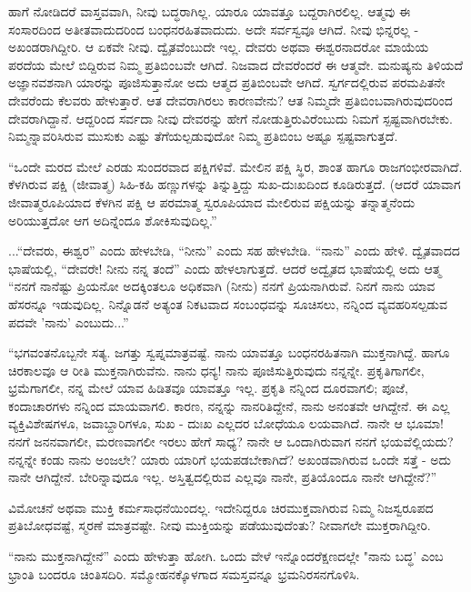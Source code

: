 ಹಾಗೆ ನೋಡಿದರೆ ವಾಸ್ತವವಾಗಿ, ನೀವು ಬದ್ಧರಾಗಿಲ್ಲ. ಯಾರೂ ಯಾವತ್ತೂ ಬದ್ದರಾಗಿರಲಿಲ್ಲ. ಆತ್ಮವು ಈ ಸಂಸಾರದಿಂದ ಅತೀತವಾದುದರಿಂದ ಬಂಧನರಹಿತವಾದುದು. ಅದೇ ಸರ್ವಸ್ವವೂ ಆಗಿದೆ. ನೀವು ಭಿನ್ನರಲ್ಲ - ಅಖಂಡರಾಗಿದ್ದೀರಿ. ಆ ಏಕವೇ ನೀವು. ದ್ವೈತವೆಂಬುದೇ ಇಲ್ಲ. ದೇವರು ಅಥವಾ ಈಶ್ವರನಾದರೋ ಮಾಯೆಯ ಪರದೆಯ ಮೇಲೆ ಬಿದ್ದಿರುವ ನಿಮ್ಮ ಪ್ರತಿಬಿಂಬವೇ ಆಗಿದೆ. ನಿಜವಾದ ದೇವರೆಂದರೆ ಈ ಆತ್ಮವೇ. ಮನುಷ್ಯನು ತಿಳಿಯದೆ ಅಜ್ಞಾನವಶನಾಗಿ ಯಾರನ್ನು ಪೂಜಿಸುತ್ತಾನೋ ಅದು ಆತ್ಮದ ಪ್ರತಿಬಿಂಬವೇ ಆಗಿದೆ. ಸ್ವರ್ಗದಲ್ಲಿರುವ ಪರಮಪಿತನೇ ದೇವರೆಂದು ಕೆಲವರು ಹೇಳುತ್ತಾರೆ. ಆತ ದೇವರಾಗಿರಲು ಕಾರಣವೇನು? ಆತ ನಿಮ್ಮದೇ ಪ್ರತಿಬಿಂಬವಾಗಿರುವುದರಿಂದ ದೇವರಾಗಿದ್ದಾನೆ. ಆದ್ದರಿಂದ ಸರ್ವದಾ ನೀವು ದೇವರನ್ನು ಹೇಗೆ ನೋಡುತ್ತಿರುವಿರೆಂಬುದು ನಿಮಗೆ ಸ್ಪಷ್ಟವಾಗಿರಬೇಕು. ನಿಮ್ಮನ್ನಾವರಿಸಿರುವ ಮುಸುಕು ಎಷ್ಟು ತೆಗೆಯಲ್ಪಡುವುದೋ ನಿಮ್ಮ ಪ್ರತಿಬಿಂಬ ಅಷ್ಟೂ ಸ್ಪಷ್ಟವಾಗುತ್ತದೆ.

“ಒಂದೇ ಮರದ ಮೇಲೆ ಎರಡು ಸುಂದರವಾದ ಪಕ್ಷಿಗಳಿವೆ. ಮೇಲಿನ ಪಕ್ಷಿ ಸ್ಥಿರ, ಶಾಂತ ಹಾಗೂ ರಾಜಗಂಭೀರವಾಗಿದೆ. ಕೆಳಗಿರುವ ಪಕ್ಷಿ (ಜೀವಾತ್ಮ) ಸಿಹಿ-ಕಹಿ ಹಣ್ಣುಗಳನ್ನು ತಿನ್ನುತ್ತಿದ್ದು ಸುಖ-ದುಃಖದಿಂದ ಕೂಡಿರುತ್ತದೆ. (ಆದರೆ ಯಾವಾಗ ಜೀವಾತ್ಮರೂಪಿಯಾದ ಕೆಳಗಿನ ಪಕ್ಷಿ ಆ ಪರಮಾತ್ಮ ಸ್ವರೂಪಿಯಾದ ಮೇಲಿರುವ ಪಕ್ಷಿಯನ್ನು ತನ್ನಾತ್ಮನೆಂದು ಅರಿಯುತ್ತದೋ ಆಗ ಅದಿನ್ನೆಂದೂ ಶೋಕಿಸುವುದಿಲ್ಲ.”

...“ದೇವರು, ಈಶ್ವರ” ಎಂದು ಹೇಳಬೇಡಿ, “ನೀನು'' ಎಂದು ಸಹ ಹೇಳಬೇಡಿ. “ನಾನು” ಎಂದು ಹೇಳಿ. ದ್ವೈತವಾದದ ಭಾಷೆಯಲ್ಲಿ, “ದೇವರೇ! ನೀನು ನನ್ನ ತಂದೆ” ಎಂದು ಹೇಳಲಾಗುತ್ತದೆ. ಆದರೆ ಅದ್ವೈತದ ಭಾಷೆಯಲ್ಲಿ ಅದು ಆತ್ಮ “ನನಗೆ ನಾನೆಷ್ಟು ಪ್ರಿಯನೋ ಅದಕ್ಕಿಂತಲೂ ಅಧಿಕವಾಗಿ (ನೀನು) ನನಗೆ ಪ್ರಿಯನಾಗಿರುವೆ. ನಿನಗೆ ನಾನು ಯಾವ ಹೆಸರನ್ನೂ ಇಡುವುದಿಲ್ಲ. ನಿನ್ನೊಡನೆ ಅತ್ಯಂತ ನಿಕಟವಾದ ಸಂಬಂಧವನ್ನು ಸೂಚಿಸಲು, ನನ್ನಿಂದ ವ್ಯವಹರಿಸಲ್ಪಡುವ ಪದವೇ 'ನಾನು' ಎಂಬುದು...”

“ಭಗವಂತನೊಬ್ಬನೇ ಸತ್ಯ. ಜಗತ್ತು ಸ್ವಪ್ನಮಾತ್ರವಷ್ಟೆ. ನಾನು ಯಾವತ್ತೂ ಬಂಧನರಹಿತನಾಗಿ ಮುಕ್ತನಾಗಿದ್ದೆ. ಹಾಗೂ ಚಿರಕಾಲವೂ ಆ ರೀತಿ ಮುಕ್ತನಾಗಿರುವೆನು. ನಾನು ಧನ್ಯ! ನಾನು ಪೂಜಿಸುತ್ತಿರುವುದು ನನ್ನನ್ನೇ. ಪ್ರಕೃತಿಗಾಗಲೀ, ಭ್ರಮೆಗಾಗಲೀ, ನನ್ನ ಮೇಲೆ ಯಾವ ಹಿಡಿತವೂ ಯಾವತ್ತೂ ಇಲ್ಲ. ಪ್ರಕೃತಿ ನನ್ನಿಂದ ದೂರವಾಗಲಿ; ಪೂಜೆ, ಕಂದಾಚಾರಗಳು ನನ್ನಿಂದ ಮಾಯವಾಗಲಿ. ಕಾರಣ, ನನ್ನನ್ನು ನಾನರಿತಿದ್ದೇನೆ, ನಾನು ಅನಂತವೇ ಆಗಿದ್ದೇನೆ. ಈ ಎಲ್ಲ ವ್ಯಕ್ತಿವಿಶೇಷಗಳೂ, ಜವಾಬ್ದಾರಿಗಳೂ, ಸುಖ - ದುಃಖ ಎಲ್ಲದರ ಬೋಧೆಯೂ ಲಯವಾಗಿದೆ. ನಾನೇ ಆ ಭೂಮಾ! ನನಗೆ ಜನನವಾಗಲೀ, ಮರಣವಾಗಲೀ ಇರಲು ಹೇಗೆ ಸಾಧ್ಯ? ನಾನೇ ಆ ಒಂದಾಗಿರುವಾಗ ನನಗೆ ಭಯವೆಲ್ಲಿಯದು? ನನ್ನನ್ನೇ ಕಂಡು ನಾನು ಅಂಜಲೇ? ಯಾರು ಯಾರಿಗೆ ಭಯಪಡಬೇಕಾಗಿದೆ? ಅಖಂಡವಾಗಿರುವ ಒಂದೇ ಸತ್ತೆ - ಅದು ನಾನೇ ಆಗಿದ್ದೇನೆ. ಬೇರಿನ್ನಾವುದೂ ಇಲ್ಲ. ಅಸ್ತಿತ್ವದಲ್ಲಿರುವ ಎಲ್ಲವೂ ನಾನೇ, ಪ್ರತಿಯೊಂದೂ ನಾನೇ ಆಗಿದ್ದೇನೆ?”

ವಿಮೋಚನೆ ಅಥವಾ ಮುಕ್ತಿ ಕರ್ಮಸಾಧನೆಯಿಂದಲ್ಲ. ಇದೇನಿದ್ದರೂ ಚಿರಮುಕ್ತವಾಗಿರುವ ನಿಮ್ಮ ನಿಜಸ್ವರೂಪದ ಪ್ರತಿಬೋಧವಷ್ಟೆ, ಸ್ಮರಣೆ ಮಾತ್ರವಷ್ಟೇ. ನೀವು ಮುಕ್ತಿಯನ್ನು ಪಡೆಯುವುದೆಂತು? ನೀವಾಗಲೇ ಮುಕ್ತರಾಗಿದ್ದೀರಿ.

“ನಾನು ಮುಕ್ತನಾಗಿದ್ದೇನೆ” ಎಂದು ಹೇಳುತ್ತಾ ಹೋಗಿ. ಒಂದು ವೇಳೆ ಇನ್ನೊಂದರೆಕ್ಷಣದಲ್ಲೇ "ನಾನು ಬದ್ಧ' ಎಂಬ ಭ್ರಾಂತಿ ಬಂದರೂ ಚಿಂತಿಸದಿರಿ. ಸಮ್ಮೋಹನಕ್ಕೊಳಗಾದ ಸಮಸ್ತವನ್ನೂ ಭ್ರಮನಿರಸನಗೊಳಿಸಿ.

